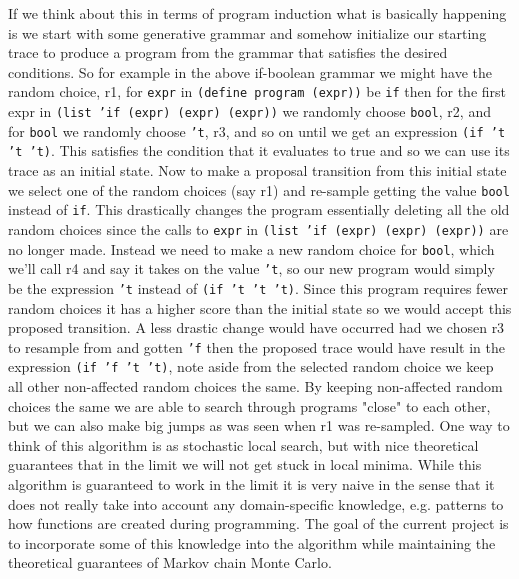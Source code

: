 \documentclass[a4paper,10pt]{article}
\begin{document}
If we think about this in terms of program induction what is basically happening is we start with some generative grammar and somehow initialize our starting trace to produce a program from the grammar that satisfies the desired conditions.   So for example in the above if-boolean grammar we might have the random choice, r1, for \texttt{expr} in \texttt{(define program (expr))} be \texttt{if} then for the first expr in \texttt{(list 'if (expr) (expr) (expr))} we randomly choose \texttt{bool}, r2, and for \texttt{bool} we randomly choose \texttt{'t}, r3, and so on until we get an expression \texttt{(if 't 't 't)}.  This satisfies the condition that it evaluates to true and so we can use its trace as an initial state.  Now to make a proposal transition from this initial state we select one of the random choices (say r1) and re-sample getting the value \texttt{bool} instead of \texttt{if}.  This drastically changes the program essentially deleting all the old random choices since the calls to \texttt{expr} in \texttt{(list 'if (expr) (expr) (expr))} are no longer made.  Instead we need to make a new random choice for \texttt{bool}, which we'll call r4 and say it takes on the value \texttt{'t}, so our new program would simply be the expression \texttt{'t} instead of \texttt{(if 't 't 't)}.  Since this program requires fewer random choices it has a higher score than the initial state so we would accept this proposed transition.  A less drastic change would have occurred had we chosen r3 to resample from and gotten \texttt{'f} then the proposed trace would have result in the expression \texttt{(if 'f 't 't)}, note aside from the selected random choice we keep all other non-affected random choices the same.  By keeping non-affected random choices the same we are able to search through programs "close" to each other, but we can also make big jumps as was seen when r1 was re-sampled.  One way to think of this algorithm is as stochastic local search, but with nice theoretical guarantees that in the limit we will not get stuck in local minima.  While this algorithm is guaranteed to work in the limit it is very naive in the sense that it does not really take into account any domain-specific knowledge, e.g. patterns to how functions are created during programming.  The goal of the current project is to incorporate some of this knowledge into the algorithm while maintaining the theoretical guarantees of Markov chain Monte Carlo.
\end{document}
